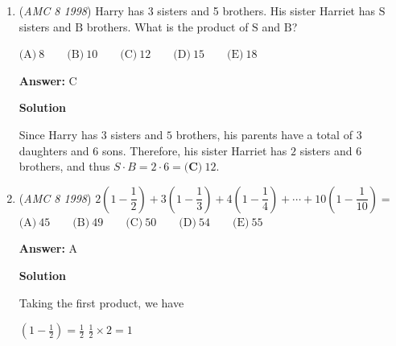 \begin{enumerate}
 $\text{(A)}\ 3 \qquad \text{(B)}\ 4 \qquad \text{(C)}\ 5 \qquad \text{(D)}\ 6 \qquad \text{(E)}\ 7$

 \textbf{Answer: }E



\textbf{Solution}

There are different ways to approach this problem, and I'll start with the different factor of the numbers of the set $\{ 1,2,3,4\}$.

 $1$ has factor $1$.

 $2$ has factors $1$ and $2$
$3$ has factors $1$ and $3$
$4$ has factors $1$, $2$, and $4$.

 From here, we note that even though all numbers have the factor $1$, only $4$ has another factor other than $1$ in the set (ie. $2$)

 We could therefore have one fraction be $\frac{4}{2}$ and another $\frac{3}{1}$.

 The sum of the numerators is $4+3=7=\boxed{E}$



	\item (\textit{AMC 8 1998}) Harry has 3 sisters and 5 brothers.  His sister Harriet has $\text{S}$ sisters and $\text{B}$ brothers.  What is the product of $\text{S}$ and $\text{B}$?


 $\text{(A)}\ 8 \qquad \text{(B)}\ 10 \qquad \text{(C)}\ 12 \qquad \text{(D)}\ 15 \qquad \text{(E)}\ 18$

 \textbf{Answer: }C



\textbf{Solution}

Since Harry has $3$ sisters and $5$ brothers, his parents have a total of $3$ daughters and $6$ sons.  Therefore, his sister Harriet has $2$ sisters and $6$ brothers, and thus $S \cdot B = 2 \cdot 6 = \boxed{\textbf{(C)}\ 12}$.

 


	\item (\textit{AMC 8 1998}) $2\left(1-\dfrac{1}{2}\right) + 3\left(1-\dfrac{1}{3}\right) + 4\left(1-\dfrac{1}{4}\right) + \cdots + 10\left(1-\dfrac{1}{10}\right)=$
$\text{(A)}\ 45 \qquad \text{(B)}\ 49 \qquad \text{(C)}\ 50 \qquad \text{(D)}\ 54 \qquad \text{(E)}\ 55$

 \textbf{Answer: }A



\textbf{Solution}

Taking the first product, we have

 $\left(1-\frac{1}{2}\right)=\frac{1}{2}$
$\frac{1}{2}\times2=1$


\end{enumerate}

